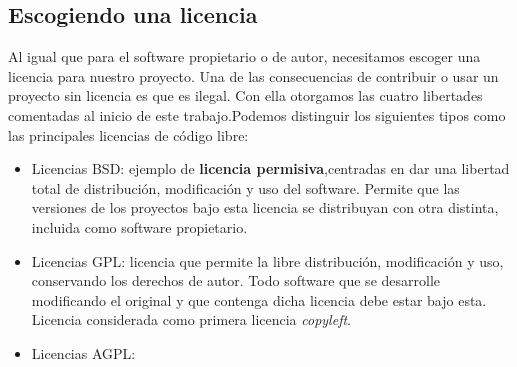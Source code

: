 \subsection*{Escogiendo una licencia}
Al igual que para el software propietario o de autor, necesitamos escoger una licencia para nuestro proyecto. Una de las consecuencias de contribuir o usar un proyecto sin licencia es que es ilegal. Con ella otorgamos las cuatro libertades comentadas al inicio de este trabajo.Podemos distinguir los siguientes tipos como las principales licencias de código libre:
\begin{itemize}
    \item Licencias BSD: ejemplo de \textbf{licencia permisiva},centradas en dar una libertad total de distribución, modificación y uso del software. Permite que las versiones de los proyectos bajo esta licencia se distribuyan con otra distinta, incluida como software propietario.
    \item Licencias GPL: licencia que permite la libre distribución, modificación y uso, conservando los derechos de autor. Todo software que se desarrolle modificando el original y que contenga dicha licencia debe estar bajo esta. Licencia considerada como primera licencia \textit{copyleft}.
    \item Licencias AGPL: 
\end{itemize}